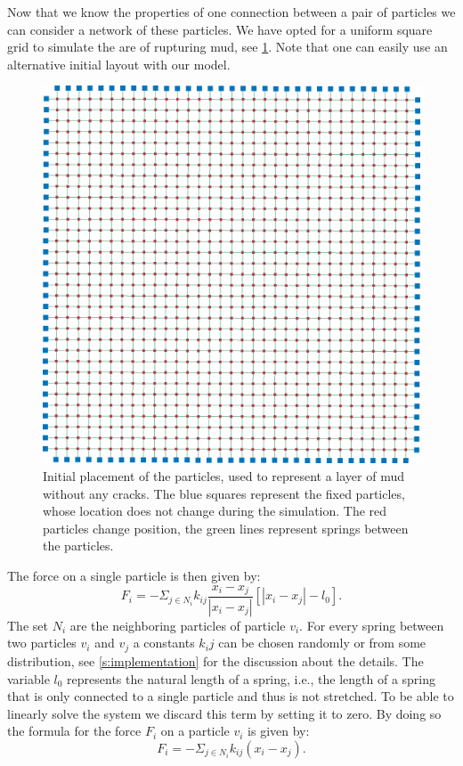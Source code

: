 Now that we know the properties of one connection between a pair of particles we can consider a network of these particles. We have opted for a uniform square grid to  simulate the are of rupturing mud, see \cref{fig:model:layout}. Note that one can easily use an alternative initial layout with our model.
%
\begin{figure}
	\centering
	\includegraphics[width=0.9\columnwidth]{img/uniform_square_grid.png}
	\caption{Initial placement of the particles, used to represent a layer of mud without any cracks. The blue squares represent the fixed particles, whose location does not change during the simulation. The red particles change position, the green lines represent springs between the particles.}
	\label{fig:model:layout}
\end{figure}
%
The force on a single particle is then given by:
%
\begin{equation}\label{eq:single:force}
	F_i = - \Sigma_{j \in N_i} k_{ij} \frac{x_i - x_j}{|x_i - x_j|}[|x_i - x_j| - l_0].
\end{equation}
%
The set $N_i$ are the neighboring particles of particle $v_i$. For every spring between two particles $v_i$ and $v_j$ a constants $k_ij$ can be chosen randomly or from some distribution, see \cref{s:implementation} for the discussion about the details. The variable $l_0$ represents the natural length of a spring, i.e., the length of a spring that is only connected to a single particle and thus is not stretched. To be able to linearly solve the system we discard this term by setting it to zero. By doing so the formula for the force $F_i$ on a particle $v_i$ is given by:
%
\begin{equation}\label{eq:single:force:simple}
	F_i = - \Sigma_{j \in N_i} k_{ij}(x_i - x_j).
\end{equation}

